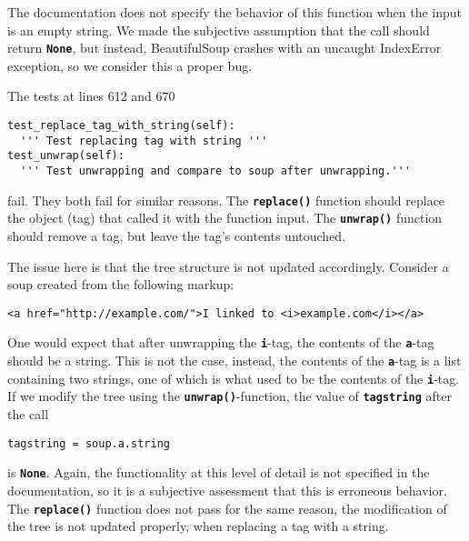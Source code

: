 \documentclass[10pt]{article}
\newcommand{\tbt}[1]{\texttt{\textbf{#1}}}
\begin{document}
The documentation does not specify the behavior of this function when the input is an empty string. We made the subjective assumption that the call should return \tbt{None}, but instead, BeautifulSoup crashes with an uncaught IndexError exception, so we consider this a proper bug. \\

\noindent\begin{minipage}{\textwidth}
\indent{\hspace{12pt}} The tests at lines 612 and 670
\begin{lstlisting}[style = pythonstyle]
test_replace_tag_with_string(self):
  ''' Test replacing tag with string '''
test_unwrap(self):
  ''' Test unwrapping and compare to soup after unwrapping.'''
\end{lstlisting}
\end{minipage}

fail. They both fail for similar reasons. The \tbt{replace()} function should replace the object (tag) that called it with the function input. The \tbt{unwrap()} function should remove a tag, but leave the tag's contents untouched. 


The issue here is that the tree structure is not updated accordingly. Consider a soup created from the following markup:
\begin{lstlisting}[style = htmlstyle]
  <a href="http://example.com/">I linked to <i>example.com</i></a>
\end{lstlisting}
One would expect that after unwrapping the \tbt{i}-tag, the contents of the \tbt{a}-tag should be a string. This is not the case, instead, the contents of the \tbt{a}-tag is a list containing two strings, one of which is what used to be the contents of the \tbt{i}-tag. If we modify the tree using the \tbt{unwrap()}-function, the value of \tbt{tagstring} after the call
\begin{lstlisting}[style = pythonstyle]
  tagstring = soup.a.string
\end{lstlisting}
is \tbt{None}. 
Again, the functionality at this level of detail is not specified in the documentation, so it is a subjective assessment that this is erroneous behavior. \\

The \tbt{replace()} function does not pass for the same reason, the modification of the tree is not updated properly, when replacing a tag with a string. \\
\end{document}
